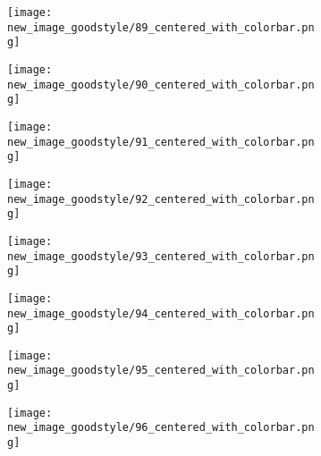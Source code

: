 \documentclass[a4paper,12pt]{article}
\begin{document}
\begin{figure}[H]
  \begin{subfigure}{0.11\textwidth}
    \texttt{[image: new\_image\_goodstyle/89\_centered\_with\_colorbar.png]}
  \end{subfigure}
  \hfill
  \begin{subfigure}{0.11\textwidth}
    \texttt{[image: new\_image\_goodstyle/90\_centered\_with\_colorbar.png]}
  \end{subfigure}
  \hfill
  \begin{subfigure}{0.11\textwidth}
    \texttt{[image: new\_image\_goodstyle/91\_centered\_with\_colorbar.png]}
  \end{subfigure}
  \hfill
  \begin{subfigure}{0.11\textwidth}
    \texttt{[image: new\_image\_goodstyle/92\_centered\_with\_colorbar.png]}
  \end{subfigure}
  \hfill
  \begin{subfigure}{0.11\textwidth}
    \texttt{[image: new\_image\_goodstyle/93\_centered\_with\_colorbar.png]}
  \end{subfigure}
  \hfill
  \begin{subfigure}{0.11\textwidth}
    \texttt{[image: new\_image\_goodstyle/94\_centered\_with\_colorbar.png]}
  \end{subfigure}
  \hfill
  \begin{subfigure}{0.11\textwidth}
    \texttt{[image: new\_image\_goodstyle/95\_centered\_with\_colorbar.png]}
  \end{subfigure}
  \hfill
  \begin{subfigure}{0.11\textwidth}
    \texttt{[image: new\_image\_goodstyle/96\_centered\_with\_colorbar.png]}
  \end{subfigure}
  \hfill
\end{figure}
\end{document}
